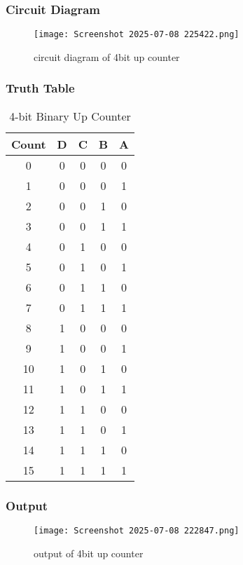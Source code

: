\documentclass[12pt]{article}
\begin{document}
\subsubsection{Circuit Diagram}
\begin{figure}[H]
    \centering
    \texttt{[image: Screenshot 2025-07-08 225422.png]}
    \caption{circuit diagram of 4bit up counter}
    \label{fig:enter-label}
\end{figure}

\subsubsection{Truth Table}

\begin{table}[H]
\centering
\begin{tabular}{|c|c|c|c|c|}
\hline
\textbf{Count} & \textbf{D} & \textbf{C} & \textbf{B} & \textbf{A} \\
\hline
0  & 0 & 0 & 0 & 0 \\
1  & 0 & 0 & 0 & 1 \\
2  & 0 & 0 & 1 & 0 \\
3  & 0 & 0 & 1 & 1 \\
4  & 0 & 1 & 0 & 0 \\
5  & 0 & 1 & 0 & 1 \\
6  & 0 & 1 & 1 & 0 \\
7  & 0 & 1 & 1 & 1 \\
8  & 1 & 0 & 0 & 0 \\
9  & 1 & 0 & 0 & 1 \\
10 & 1 & 0 & 1 & 0 \\
11 & 1 & 0 & 1 & 1 \\
12 & 1 & 1 & 0 & 0 \\
13 & 1 & 1 & 0 & 1 \\
14 & 1 & 1 & 1 & 0 \\
15 & 1 & 1 & 1 & 1 \\
\hline
\end{tabular}
\caption{4-bit Binary Up Counter}
\end{table}

\subsubsection{Output}
\begin{figure}[H]
    \centering
    \texttt{[image: Screenshot 2025-07-08 222847.png]}
    \caption{output of 4bit up counter}
    \label{fig:enter-label}
\end{figure}
\end{document}
